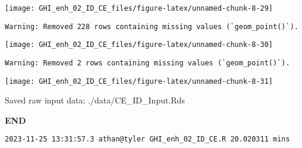 \documentclass[
  10pt,
  a4paper,oneside]{article}
\begin{document}
\begin{center}\texttt{[image: GHI\_enh\_02\_ID\_CE\_files/figure-latex/unnamed-chunk-8-29]} \end{center}

\begin{verbatim}
Warning: Removed 228 rows containing missing values (`geom_point()`).
\end{verbatim}

\begin{center}\texttt{[image: GHI\_enh\_02\_ID\_CE\_files/figure-latex/unnamed-chunk-8-30]} \end{center}

\begin{verbatim}
Warning: Removed 2 rows containing missing values (`geom_point()`).
\end{verbatim}

\begin{center}\texttt{[image: GHI\_enh\_02\_ID\_CE\_files/figure-latex/unnamed-chunk-8-31]} \end{center}

Saved raw input data: ./data/CE\_ID\_Input.Rds

\textbf{END}

\begin{verbatim}
2023-11-25 13:31:57.3 athan@tyler GHI_enh_02_ID_CE.R 20.020311 mins
\end{verbatim}
\end{document}
